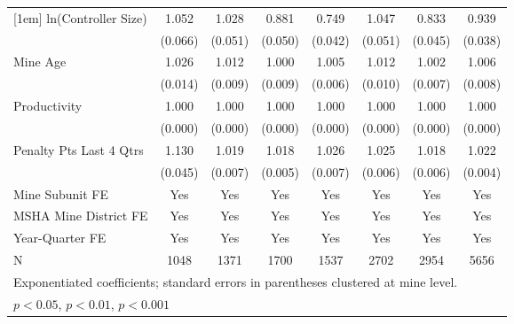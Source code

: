 {\begin{tabular}{l*{7}{c}}
[1em]
ln(Controller Size)      &       1.052         &       1.028         &       0.881\sym{*}  &       0.749\sym{***}&       1.047         &       0.833\sym{***}&       0.939         \\
                         &     (0.066)         &     (0.051)         &     (0.050)         &     (0.042)         &     (0.051)         &     (0.045)         &     (0.038)         \\
[1em]
Mine Age                 &       1.026         &       1.012         &       1.000         &       1.005         &       1.012         &       1.002         &       1.006         \\
                         &     (0.014)         &     (0.009)         &     (0.009)         &     (0.006)         &     (0.010)         &     (0.007)         &     (0.008)         \\
[1em]
Productivity             &       1.000         &       1.000         &       1.000         &       1.000         &       1.000         &       1.000         &       1.000         \\
                         &     (0.000)         &     (0.000)         &     (0.000)         &     (0.000)         &     (0.000)         &     (0.000)         &     (0.000)         \\
[1em]
Penalty Pts Last 4 Qtrs  &       1.130\sym{**} &       1.019\sym{**} &       1.018\sym{***}&       1.026\sym{***}&       1.025\sym{***}&       1.018\sym{**} &       1.022\sym{***}\\
                         &     (0.045)         &     (0.007)         &     (0.005)         &     (0.007)         &     (0.006)         &     (0.006)         &     (0.004)         \\
[1em]
Mine Subunit FE          &         Yes         &         Yes         &         Yes         &         Yes         &         Yes         &         Yes         &         Yes         \\
[1em]
MSHA Mine District FE    &         Yes         &         Yes         &         Yes         &         Yes         &         Yes         &         Yes         &         Yes         \\
[1em]
Year-Quarter FE          &         Yes         &         Yes         &         Yes         &         Yes         &         Yes         &         Yes         &         Yes         \\
\hline
N                        &        1048         &        1371         &        1700         &        1537         &        2702         &        2954         &        5656         \\
\hline\hline
\multicolumn{8}{l}{\footnotesize Exponentiated coefficients; standard errors in parentheses clustered at mine level.}\\
\multicolumn{8}{l}{\footnotesize \sym{*} \(p<0.05\), \sym{**} \(p<0.01\), \sym{***} \(p<0.001\)}\\
\end{tabular}
}
